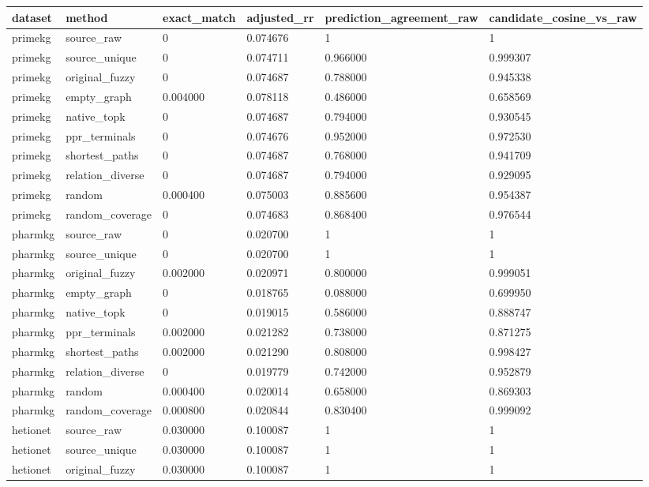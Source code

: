 \begin{tabular}{llllll}
\hline
dataset & method & exact\_match & adjusted\_rr & prediction\_agreement\_raw & candidate\_cosine\_vs\_raw \\
\hline
primekg & source\_raw & 0 & 0.074676 & 1 & 1 \\
primekg & source\_unique & 0 & 0.074711 & 0.966000 & 0.999307 \\
primekg & original\_fuzzy & 0 & 0.074687 & 0.788000 & 0.945338 \\
primekg & empty\_graph & 0.004000 & 0.078118 & 0.486000 & 0.658569 \\
primekg & native\_topk & 0 & 0.074687 & 0.794000 & 0.930545 \\
primekg & ppr\_terminals & 0 & 0.074676 & 0.952000 & 0.972530 \\
primekg & shortest\_paths & 0 & 0.074687 & 0.768000 & 0.941709 \\
primekg & relation\_diverse & 0 & 0.074687 & 0.794000 & 0.929095 \\
primekg & random & 0.000400 & 0.075003 & 0.885600 & 0.954387 \\
primekg & random\_coverage & 0 & 0.074683 & 0.868400 & 0.976544 \\
pharmkg & source\_raw & 0 & 0.020700 & 1 & 1 \\
pharmkg & source\_unique & 0 & 0.020700 & 1 & 1 \\
pharmkg & original\_fuzzy & 0.002000 & 0.020971 & 0.800000 & 0.999051 \\
pharmkg & empty\_graph & 0 & 0.018765 & 0.088000 & 0.699950 \\
pharmkg & native\_topk & 0 & 0.019015 & 0.586000 & 0.888747 \\
pharmkg & ppr\_terminals & 0.002000 & 0.021282 & 0.738000 & 0.871275 \\
pharmkg & shortest\_paths & 0.002000 & 0.021290 & 0.808000 & 0.998427 \\
pharmkg & relation\_diverse & 0 & 0.019779 & 0.742000 & 0.952879 \\
pharmkg & random & 0.000400 & 0.020014 & 0.658000 & 0.869303 \\
pharmkg & random\_coverage & 0.000800 & 0.020844 & 0.830400 & 0.999092 \\
hetionet & source\_raw & 0.030000 & 0.100087 & 1 & 1 \\
hetionet & source\_unique & 0.030000 & 0.100087 & 1 & 1 \\
hetionet & original\_fuzzy & 0.030000 & 0.100087 & 1 & 1 \\

\end{tabular}
